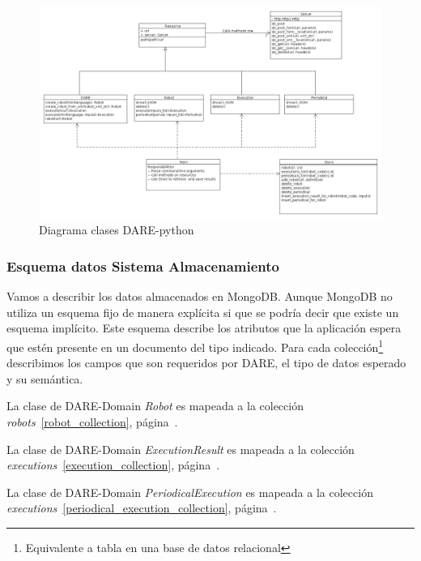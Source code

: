 \begin{landscape}
\begin{figure}[hp]
\includegraphics[width=1.4\textwidth]{chapters/technical-manual/diagrams/clases_dare_python.png}
\caption{Diagrama clases DARE-python}\label{diagrama_clases_dare_python}
\end{figure}
\end{landscape}

\subsubsection{Esquema datos Sistema Almacenamiento}

Vamos a describir los datos almacenados en MongoDB. Aunque MongoDB no
utiliza un esquema fijo de manera explícita si que se podría decir que
existe un esquema implícito. Este esquema describe los atributos que
la aplicación espera que estén presente en un documento del tipo
indicado. Para cada colección\footnote{Equivalente a tabla en una base
de datos relacional} describimos los campos que son requeridos por
DARE, el tipo de datos esperado y su semántica.

La clase de DARE-Domain \emph{Robot} es mapeada a la colección
\emph{robots}~\ref{robot_collection},
página~\pageref{robot_collection}.

La clase de DARE-Domain \emph{ExecutionResult} es mapeada a la
colección \emph{executions}~\ref{execution_collection},
página~\pageref{execution_collection}.

La clase de DARE-Domain \emph{PeriodicalExecution} es mapeada a la
colección \emph{executions}~\ref{periodical_execution_collection},
página~\pageref{periodical_execution_collection}.

